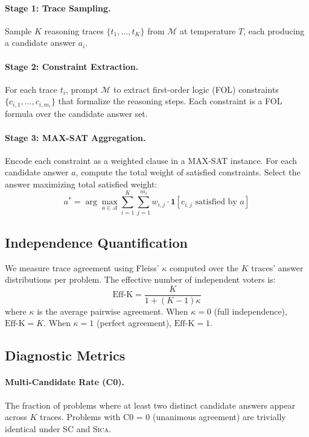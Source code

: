 \documentclass[11pt,a4paper]{article}
\newcommand{\sica}{\textsc{Sica}}
\newcommand{\effk}{\text{Eff-K}}
\begin{document}
\paragraph{Stage 1: Trace Sampling.}
Sample $K$ reasoning traces $\{t_1, \ldots, t_K\}$ from $\mathcal{M}$ at temperature $T$, each producing a candidate answer $a_i$.

\paragraph{Stage 2: Constraint Extraction.}
For each trace $t_i$, prompt $\mathcal{M}$ to extract first-order logic (FOL) constraints $\{c_{i,1}, \ldots, c_{i,m_i}\}$ that formalize the reasoning steps. Each constraint is a FOL formula over the candidate answer set.

\paragraph{Stage 3: MAX-SAT Aggregation.}
Encode each constraint as a weighted clause in a MAX-SAT instance. For each candidate answer $a$, compute the total weight of satisfied constraints. Select the answer maximizing total satisfied weight:
\begin{equation}
a^* = \arg\max_{a \in \mathcal{A}} \sum_{i=1}^{K} \sum_{j=1}^{m_i} w_{i,j} \cdot \mathbf{1}[c_{i,j} \text{ satisfied by } a]
\end{equation}

\subsection{Independence Quantification}

We measure trace agreement using Fleiss' $\kappa$ \citep{fleiss1971} computed over the $K$ traces' answer distributions per problem. The effective number of independent voters is:
\begin{equation}
\effk{} = \frac{K}{1 + (K-1)\kappa}
\end{equation}
where $\kappa$ is the average pairwise agreement. When $\kappa = 0$ (full independence), $\effk{} = K$. When $\kappa = 1$ (perfect agreement), $\effk{} = 1$.

\subsection{Diagnostic Metrics}

\paragraph{Multi-Candidate Rate (C0).}
The fraction of problems where at least two distinct candidate answers appear across $K$ traces. Problems with C0 = 0 (unanimous agreement) are trivially identical under SC and \sica{}.
\end{document}
